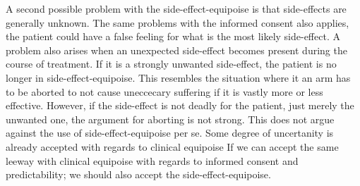 \documentclass[12p]{article}
\begin{document}
A second possible problem with the side-effect-equipoise is that side-effects are generally unknown.
The same problems with the informed consent also applies, the patient could have a false feeling for what is the most likely side-effect.
A problem also arises when an unexpected side-effect becomes present during the course of treatment.
If it is a strongly unwanted side-effect, the patient is no longer in side-effect-equipoise.
This resembles the situation where it an arm has to be aborted to not cause uneccecary suffering if it is vastly more or less effective.
However, if the side-effect is not deadly for the patient, just merely the unwanted one, the argument for aborting is not strong.
This does not argue against the use of side-effect-equipoise per se.
Some degree of uncertanity is already accepted with regards to clinical equipoise
If we can accept the same leeway with clinical equipoise with regards to informed consent and predictability; we should also accept the side-effect-equipoise.



%
\end{document}

